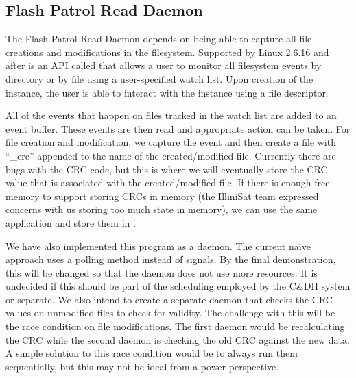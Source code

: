 \subsection{Flash Patrol Read Daemon}
The Flash Patrol Read Daemon depends on being able to capture all file creations
and modifications in the filesystem. Supported by Linux 2.6.16 and after is an
API called  that allows a user to monitor all filesystem events by
directory or by file using a user-specified watch list. Upon creation of the
 instance, the user is able to interact with the instance using a
file descriptor. 

All of the events that happen on files tracked in the watch list are added to an
 event buffer.  These events are then read and appropriate action
can be taken. For file creation and modification, we capture the event and then
create a file with ``\_crc'' appended to the name of the created/modified file.
Currently there are bugs with the CRC code, but this is where we will eventually
store the CRC value that is associated with the created/modified file.  If there
is enough free memory to support storing CRCs in memory (the IlliniSat team
expressed concerns with us storing too much state in memory), we can use the
same application and store them in .

We have also implemented this program as a daemon. The current na\"ive approach 
uses a polling method instead of signals.  By the final demonstration, this
will be changed so that the daemon does not use more resources.  It is undecided
if this should be part of the  scheduling employed by the C\&DH system
or separate.  We also intend to create a separate daemon that checks the CRC 
values on unmodified files to check for validity.  The challenge with this will
be the race condition on file modifications.  The first daemon would be
recalculating the CRC while the second daemon is checking the old CRC against
the new data.  A simple solution to this race condition would be to always run
them sequentially, but this may not be ideal from a power perspective.

